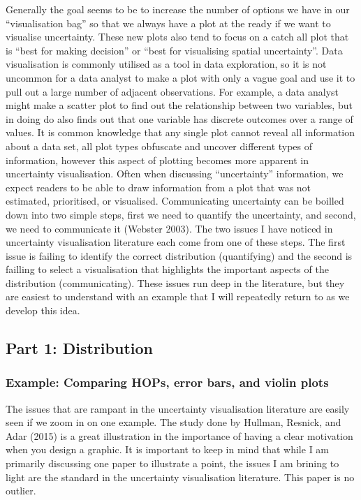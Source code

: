 \documentclass[
  letterpaper,
  DIV=11,
  numbers=noendperiod]{scrartcl}
\begin{document}
Generally the goal seems to be to increase the number of options we have
in our ``visualisation bag'' so that we always have a plot at the ready
if we want to visualise uncertainty. These new plots also tend to focus
on a catch all plot that is ``best for making decision'' or ``best for
visualising spatial uncertainty''. Data visualisation is commonly
utilised as a tool in data exploration, so it is not uncommon for a data
analyst to make a plot with only a vague goal and use it to pull out a
large number of adjacent observations. For example, a data analyst might
make a scatter plot to find out the relationship between two variables,
but in doing do also finds out that one variable has discrete outcomes
over a range of values. It is common knowledge that any single plot
cannot reveal all information about a data set, all plot types obfuscate
and uncover different types of information, however this aspect of
plotting becomes more apparent in uncertainty visualisation. Often when
discussing ``uncertainty'' information, we expect readers to be able to
draw information from a plot that was not estimated, prioritised, or
visualised. Communicating uncertainty can be boilled down into two
simple steps, first we need to quantify the uncertainty, and second, we
need to communicate it (Webster 2003). The two issues I have noticed in
uncertainty visualisation literature each come from one of these steps.
The first issue is failing to identify the correct distribution
(quantifying) and the second is failling to select a visualisation that
highlights the important aspects of the distribution (communicating).
These issues run deep in the literature, but they are easiest to
understand with an example that I will repeatedly return to as we
develop this idea.

\hypertarget{part-1-distribution}{%
\subsection{Part 1: Distribution}\label{part-1-distribution}}

\hypertarget{example-comparing-hops-error-bars-and-violin-plots}{%
\subsubsection{Example: Comparing HOPs, error bars, and violin
plots}\label{example-comparing-hops-error-bars-and-violin-plots}}

The issues that are rampant in the uncertainty visualisation literature
are easily seen if we zoom in on one example. The study done by Hullman,
Resnick, and Adar (2015) is a great illustration in the importance of
having a clear motivation when you design a graphic. It is important to
keep in mind that while I am primarily discussing one paper to
illustrate a point, the issues I am brining to light are the standard in
the uncertainty visualisation literature. This paper is no outlier.
\end{document}
